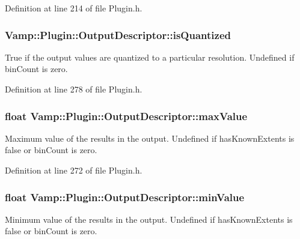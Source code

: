 Definition at line 214 of file Plugin.\+h.

\subsubsection[{\texorpdfstring{is\+Quantized}{isQuantized}}]{ Vamp\+::\+Plugin\+::\+Output\+Descriptor\+::is\+Quantized}\hypertarget{struct_vamp_1_1_plugin_1_1_output_descriptor_a1b4858928d23bfd7d5bc557c82a83fb4}{}\label{struct_vamp_1_1_plugin_1_1_output_descriptor_a1b4858928d23bfd7d5bc557c82a83fb4}
True if the output values are quantized to a particular resolution. Undefined if bin\+Count is zero. 

Definition at line 278 of file Plugin.\+h.

\subsubsection[{\texorpdfstring{max\+Value}{maxValue}}]{\setlength{\rightskip}{0pt plus 5cm}float Vamp\+::\+Plugin\+::\+Output\+Descriptor\+::max\+Value}\hypertarget{struct_vamp_1_1_plugin_1_1_output_descriptor_a907b4e8fbb48a46ac5a05f880d72719f}{}\label{struct_vamp_1_1_plugin_1_1_output_descriptor_a907b4e8fbb48a46ac5a05f880d72719f}
Maximum value of the results in the output. Undefined if has\+Known\+Extents is false or bin\+Count is zero. 

Definition at line 272 of file Plugin.\+h.

\subsubsection[{\texorpdfstring{min\+Value}{minValue}}]{\setlength{\rightskip}{0pt plus 5cm}float Vamp\+::\+Plugin\+::\+Output\+Descriptor\+::min\+Value}\hypertarget{struct_vamp_1_1_plugin_1_1_output_descriptor_ac9f5924c0be7571bba8e7ae7e7a921f4}{}\label{struct_vamp_1_1_plugin_1_1_output_descriptor_ac9f5924c0be7571bba8e7ae7e7a921f4}
Minimum value of the results in the output. Undefined if has\+Known\+Extents is false or bin\+Count is zero. 

